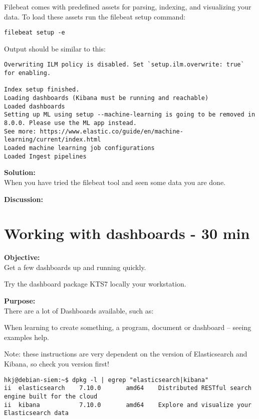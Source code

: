 \documentclass[a4paper,11pt,notitlepage]{report}
\begin{document}

Filebeat comes with predefined assets for parsing, indexing, and visualizing your data. To load these assets run the filebeat setup command:

\begin{verbatim}
filebeat setup -e
\end{verbatim}

Output should be similar to this:
\begin{verbatim}
Overwriting ILM policy is disabled. Set `setup.ilm.overwrite: true` for enabling.

Index setup finished.
Loading dashboards (Kibana must be running and reachable)
Loaded dashboards
Setting up ML using setup --machine-learning is going to be removed in 8.0.0. Please use the ML app instead.
See more: https://www.elastic.co/guide/en/machine-learning/current/index.html
Loaded machine learning job configurations
Loaded Ingest pipelines
\end{verbatim}


{\bf Solution:}\\
When you have tried the filebeat tool and seen some data you are done.

{\bf Discussion:}\\



\chapter{Working with dashboards - 30 min}
\label{ex:kibana-kts}

{\bf Objective:}\\
Get a few dashboards up and running quickly.

Try the dashboard package KTS7 locally your workstation.


{\bf Purpose:}\\
There are a lot of Dashboards available, such as:\\

When learning to create something, a program, document or dashboard -- seeing examples help.

Note: these instructions are very dependent on the version of Elasticsearch and Kibana, so check you version first!
\begin{verbatim}
hkj@debian-siem:~$ dpkg -l | egrep "elasticsearch|kibana"
ii  elasticsearch    7.10.0       amd64    Distributed RESTful search engine built for the cloud
ii  kibana           7.10.0       amd64    Explore and visualize your Elasticsearch data
\end{verbatim}
\end{document}
